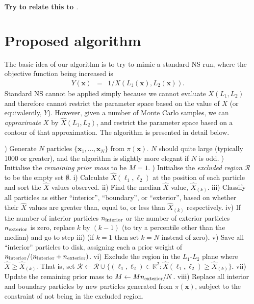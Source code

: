 \documentclass[journal,article,accept,moreauthors,pdftex,12pt,a4paper]{mdpi}
\newcommand{\xx}{\boldsymbol{x}}
\begin{document}
{\bf Try to relate this to \citet{vertical}}.

\section{Proposed algorithm}\label{sec:algorithm}

The basic idea of our algorithm is to try to mimic a standard NS run, where the
objective function being increased is
\begin{eqnarray}
Y(\xx) &=& 1/X\left(L_1(\xx), L_2(\xx)\right).
\end{eqnarray}
Standard NS cannot be applied simply because we cannot evaluate $X(L_1, L_2)$ and
therefore cannot restrict the parameter space based on the value of $X$ (or
equivalently, $Y$). However, given a number of Monte Carlo samples, we
can {\em approximate} $X$ by $\hat{X}(L_1, L_2)$, and restrict the parameter
space based on a contour of that approximation.
The algorithm is presented in detail below.

\begin{algorithm}[ht!]
\begin{algorithmic}
) Generate $N$ particles $\{\xx_1, ..., \xx_N\}$ from $\pi(\xx)$.
$N$ should quite large (typically 1000 or greater), and the algorithm is
slightly more elegant if $N$ is odd.
) Initialise the {\em remaining prior mass} to be $M=1$.
) Initialise the {\em excluded region} $\mathcal{R}$ to be the empty set
$\emptyset$.
	\State i) Calculate $\hat{X}(\ell_1, \ell_2)$ at the position of each particle
			and sort the $\hat{X}$ values observed.
	\State ii) Find the median $\hat{X}$ value, $\hat{X}_{(k)}$.
	\State iii) Classify all particles as either ``interior'', ``boundary'', or
			``exterior'', based on whether their $\hat{X}$ values are
			greater than, equal to, or less than $\hat{X}_{(k)}$ respectively.
	\State iv) If the number of interior particles $n_{\rm interior}$ or the number
			of exterior particles $n_{\rm exterior}$ is zero, replace $k$ by
			$(k-1)$ (to try a percentile other than the median)
			and go to step iii) (if $k=1$ then set $k=N$ instead of zero).
	\State v) Save all ``interior'' particles to disk, assigning each a prior weight of $n_{\rm interior}/(n_{\rm interior} + n_{\rm exterior})$.
	\State vi) Exclude the region in the $L_1$-$L_2$ plane where
$\hat{X} \geq \hat{X}_{(k)}$. That is, set
	\State \hspace{20pt} $\mathcal{R} \leftarrow \mathcal{R} \cup \{(\ell_1, \ell_2) \in \mathbb{R}^2: \hat{X}(\ell_1, \ell_2) \geq \hat{X}_{(k)}\}$.
	\State vii) Update the remaining prior mass to $M \leftarrow M n_{\rm exterior}/N$.
	\State viii) Replace all interior and boundary particles by new
			particles generated from $\pi(\xx)$, subject to the constraint
			of not being in the excluded region.
\EndWhile
\end{algorithmic}
\caption{\label{alg:algorithm}}
\end{algorithm}
\end{document}
